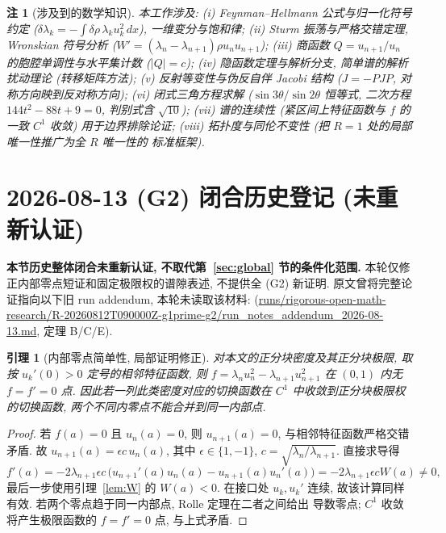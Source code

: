 \documentclass[UTF8]{ctexart}
\newtheorem{lemma}[theorem]{引理}
\newtheorem{remark}[theorem]{注}
\begin{document}
\begin{remark}[涉及到的数学知识]
本工作涉及: (i) Feynman--Hellmann 公式与归一化符号约定
($\delta\lambda_k=-\int\delta\rho\,\lambda_ku_k^2\,dx$), 一维变分与饱和律;
(ii) Sturm 振荡与严格交错定理, Wronskian 符号分析 ($W'=(\lambda_n-\lambda_{n+1})\rho u_nu_{n+1}$);
(iii) 商函数 $Q=u_{n+1}/u_n$ 的胞腔单调性与水平集计数 ($|Q|=c$);
(iv) 隐函数定理与解析分支, 简单谱的解析扰动理论 (转移矩阵方法);
(v) 反射等变性与伪反自伴 Jacobi 结构 ($J=-PJP$, 对称方向映到反对称方向);
(vi) 闭式三角方程求解 ($\sin3\theta/\sin2\theta$ 恒等式, 二次方程
$144t^2-88t+9=0$, 判别式含 $\sqrt{10}$);
(vii) 谱的连续性 (紧区间上特征函数与 $f$ 的一致 $C^1$ 收敛) 用于边界排除论证;
(viii) 拓扑度与同伦不变性 (把 $R=1$ 处的局部唯一性推广为全 $R$ 唯一性的
标准框架).
\end{remark}


\section{2026-08-13 (G2) 闭合历史登记 (未重新认证)}\label{sec:g2closed}

\textbf{本节历史整体闭合未重新认证, 不取代第~\ref{sec:global} 节的条件化范围.}
本轮仅修正内部零点短证和固定极限权的谱隙表述, 不提供全 (G2) 新证明.
原文曾将完整论证指向以下旧 run addendum, 本轮未读取该材料:
 (\url{runs/rigorous-open-math-research/R-20260812T090000Z-g1prime-g2/run_notes_addendum_2026-08-13.md}, 定理 B/C/E).

\begin{lemma}[内部零点简单性, 局部证明修正]\label{lem:simplez}
对本文的正分块密度及其正分块极限, 取按 $u_k'(0)>0$ 定号的相邻特征函数,
则 $f=\lambda_nu_n^2-\lambda_{n+1}u_{n+1}^2$ 在 $(0,1)$ 内无 $f=f'=0$ 点.
因此若一列此类密度对应的切换函数在 $C^1$ 中收敛到正分块极限权的切换函数,
两个不同内零点不能合并到同一内部点.
\end{lemma}
\begin{proof}
若 $f(a)=0$ 且 $u_n(a)=0$, 则 $u_{n+1}(a)=0$, 与相邻特征函数严格交错矛盾.
故 $u_{n+1}(a)=\epsilon c\,u_n(a)$, 其中 $\epsilon\in\{1,-1\}$,
$c=\sqrt{\lambda_n/\lambda_{n+1}}$. 直接求导得
\begin{equation*}
f'(a)=-2\lambda_{n+1}\epsilon c\,
\bigl(u_{n+1}'(a)u_n(a)-u_{n+1}(a)u_n'(a)\bigr)
=-2\lambda_{n+1}\epsilon c W(a)\ne0,
\end{equation*}
最后一步使用引理~\ref{lem:W} 的 $W(a)<0$. 在接口处 $u_k,u_k'$ 连续,
故该计算同样有效. 若两个零点趋于同一内部点, Rolle 定理在二者之间给出
导数零点; $C^1$ 收敛将产生极限函数的 $f=f'=0$ 点, 与上式矛盾.
\end{proof}
\end{document}
